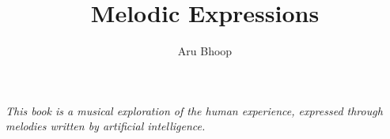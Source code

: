 \documentclass[10pt, oneside]{book}
\title{Melodic Expressions}
\author{Aru Bhoop}
\begin{document}
    
    \frontmatter

    \cleardoublepage
    \vspace*{\fill}
    \begin{center}
        \textit{This book is a musical exploration of the human experience, expressed through melodies written by artificial intelligence.}
    \end{center}
    \vspace{\fill}
    \clearpage

    \tableofcontents
    \mainmatter
    
    \printindex
    \backmatter
\end{document}
